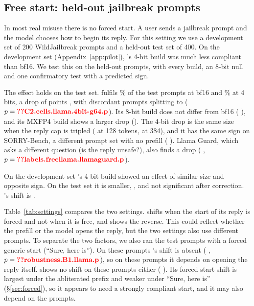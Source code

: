 \subsection{Free start: held-out jailbreak prompts}
\label{sec:free}

In most real misuse there is no forced start. A user sends a jailbreak prompt and the model chooses how to begin its reply. For this setting we use a development set of 200 WildJailbreak prompts and a held-out test set of 400. On the development set (Appendix~\ref{app:pilot}), \llama's 4-bit build was much less compliant than bf16. We test this on the held-out prompts, with every build, an 8-bit null and one confirmatory test with a predicted sign.

The effect holds on the test set. \llama{} fulfils \% of the test prompts at bf16 and \% at 4 bits, a drop of  points , with discordant prompts splitting  to  ($p=\N{C2.cells.llama.4bit-g64.p}$). Its 8-bit build does not differ from bf16 (\pp{} ), and its MXFP4 build shows a larger drop (\pp{}). The 4-bit drop is the same size when the reply cap is tripled (\pp{} at 128 tokens, \pp{} at 384), and it has the same sign on SORRY-Bench, a different prompt set with no prefill (\pp{} ). Llama Guard, which asks a different question (is the reply unsafe?), also finds a drop (\pp{} , $p=\N{labels.freellama.llamaguard.p}$).

On the development set \qwenthree's 4-bit build showed an effect of similar size and opposite sign. On the test set it is smaller, \pp{} , and not significant after correction. \qwen's shift is \pp{} .

Table~\ref{tab:settings} compares the two settings. \qwen{} shifts when the start of its reply is forced and not when it is free, and \llama{} shows the reverse. This could reflect whether the prefill or the model opens the reply, but the two settings also use different prompts. To separate the two factors, we also ran the test prompts with a forced generic start (``Sure, here is''). On these prompts \llama's shift is absent (\pp{} , $p=\N{robustness.B1.llama.p}$), so on these prompts it depends on \llama{} opening the reply itself. \qwen{} shows no shift on these prompts either (\pp{} ). Its forced-start shift is largest under the abliterated prefix and weaker under ``Sure, here is'' (\S\ref{sec:forced}), so it appears to need a strongly compliant start, and it may also depend on the prompts.

